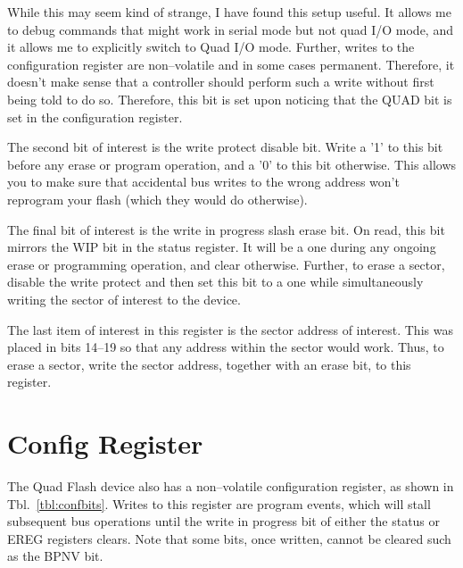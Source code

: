 \documentclass{gqtekspec}
\begin{document}
While this may seem kind of strange, I have found this setup useful.  It allows
me to debug commands that might work in serial mode but not quad I/O mode,
and it allows me to explicitly switch to Quad I/O mode.  Further, writes to the
configuration register are non--volatile and in some cases permanent. 
Therefore, it doesn't make sense that a controller should perform such a write
without first being told to do so.  Therefore, this bit is set upon
noticing that the QUAD bit is set in the configuration register.

The second bit of interest is the write protect disable bit.  Write a '1'
to this bit before any erase or program operation, and a '0' to this bit
otherwise.  This allows you to make sure that accidental bus writes to the
wrong address won't reprogram your flash (which they would do otherwise).

The final bit of interest is the write in progress slash erase bit.  On read,
this bit mirrors the WIP bit in the status register.  It will be a one during
any ongoing erase or programming operation, and clear otherwise.  Further,
to erase a sector, disable the write protect and then set this bit to a one
while simultaneously writing the sector of interest to the device.

The last item of interest in this register is the sector address of interest.
This was placed in bits 14--19 so that any address within the sector
would work.  Thus, to erase a sector, write the sector address, together with
an erase bit, to this register.

\section{Config Register}

The Quad Flash device also has a non--volatile configuration register, as
shown in Tbl.~\ref{tbl:confbits}.  Writes to this register are program events, 
which will stall subsequent bus operations until the write in progress bit
of either the status or EREG registers clears.  Note that some bits, once
written, cannot be cleared such as the BPNV bit.
\end{document}
